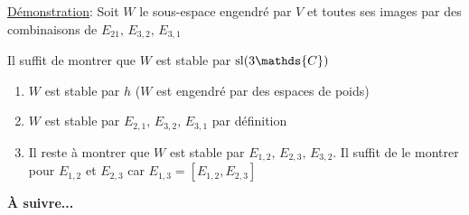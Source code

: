 \underline{Démonstration}: Soit \(W\) le sous-espace engendré par \(V\) et toutes ses images par des combinaisons de \(E_{21},\, E_{3,2}, \, E_{3,1}\)

Il suffit de montrer que \(W\) est stable par \({\rm{}sl}(3 \mathds{C})\)

\begin{enumerate}
	\item \(W\) est stable par \(h\) (\(W\) est engendré par des espaces de poids)
	\item \(W\) est stable par \(E_{2,1}, \, E_{3,2},\, E_{3,1}  \) par définition 
	\item Il reste à montrer que \(W\) est stable par \(E_{1,2},\, E_{2,3},\, E_{3,2}  \). Il suffit de le montrer pour \(E_{1,2} \) et \( E_{2,3} \) car \(E_{1,3} = [E_{1,2}, E_{2,3}] \) 
\end{enumerate}

\begin{center}
	\huge\textbf{À suivre... }	
\end{center}


